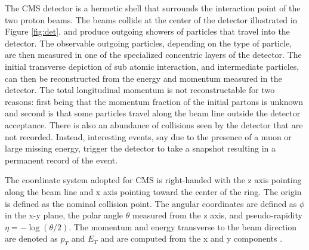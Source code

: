 The CMS detector is a hermetic shell that surrounds the interaction point of the two proton beams. The beams collide at the center of the detector illustrated in Figure \ref{fig:det}. and produce outgoing showers of particles that travel into the detector. The observable outgoing particles, depending on the type of particle, are then measured in one of the specialized concentric layers of the detector. The initial transverse depiction of sub atomic interaction, and intermediate particles, can then be reconstructed from the energy and momentum measured in the detector. The total longitudinal momentum is not reconstructable for two reasons: first being that the momentum fraction of the initial partons is unknown and second is that some particles travel along the beam line outside the detector acceptance.  There is also an abundance of collisions seen by the detector that are not recorded. Instead, interesting events, say due to the presence of a muon or large missing energy, trigger the detector to take a snapshot resulting in a permanent record of the event.

The coordinate system adopted for CMS is right-handed with the z axis pointing along the beam line and x axis pointing toward the center of the ring. The origin is defined as the nominal collision point. The angular coordinates are defined as $\phi$ in the x-y plane, the polar angle $\theta$ measured from the z axis, and pseudo-rapidity $\eta =-\log(\theta/2)$. The momentum and energy transverse to the beam direction are denoted as $p_T$ and $E_T$ and are computed from the x and y components \cite{CMS:2017lum}. 

